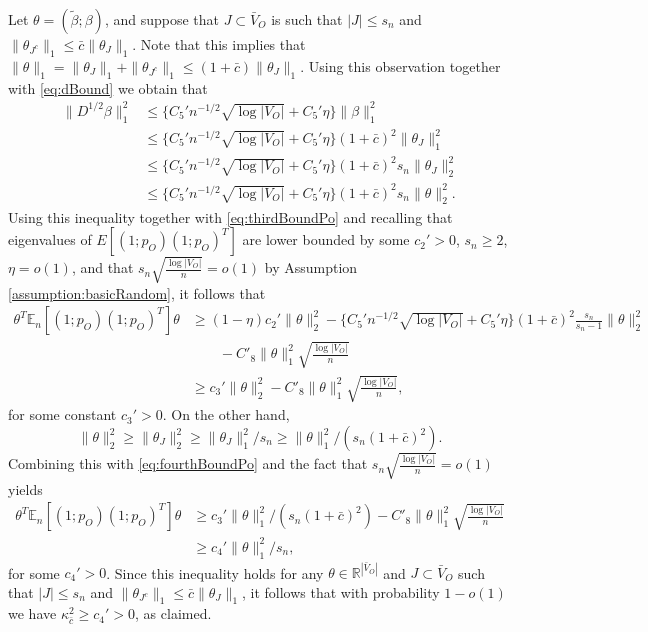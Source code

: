 \documentclass[opre,nonblindrev]{informs3} %
\def\En{{\mathbb{E}_n}}
\begin{document}
\begin{APPENDIX}{}
Let $\theta= (\tilde \beta; \beta)$, and suppose that
$J\subset \bar{V}_O$ is such that
$|J|\leq s_n$ and  $\|\theta_{J^c}\|_1\leq \bar{c} \|\theta_{J}\|_1$.
Note that this implies that $\|\theta\|_1 =
\|\theta_J\|_1+\|\theta_{J^c}\|_1\leq (1+\bar{c})\|\theta_J\|_1$.
Using
this observation together with
\eqref{eq:dBound}
we obtain that
$$\begin{array}{rl}
\|D^{1/2}\beta\|_1^2 & \leq \{C_5'n^{-1/2}\sqrt{\log |V_O|} + C_5'\eta\}\|\beta\|_1^2 \\
& \leq \{C_5'n^{-1/2}\sqrt{\log |V_O|} + C_5'\eta\}(1+\bar{c})^2\|\theta_{J}\|_1^2 \\
& \leq \{C_5'n^{-1/2}\sqrt{\log |V_O|} + C_5'\eta\}(1+\bar{c})^2s_n\|\theta_J\|_2^2 \\
& \leq \{C_5'n^{-1/2}\sqrt{\log |V_O|} + C_5'\eta\}(1+\bar{c})^2s_n\|\theta\|_2^2.
\end{array}$$
Using this inequality together with
\eqref{eq:thirdBoundPo}
and  recalling that 
eigenvalues of $E[(1;p_O)(1;p_O)^T]$ are lower bounded by some $c_2'>0$, $s_n\geq 2$, 
$\eta=o(1)$,
and that $s_n \sqrt{\frac{\log |V_O|}{n}}  = o(1)$ by Assumption \ref{assumption:basicRandom},
it follows that
\begin{equation} \label{eq:fourthBoundPo}
\begin{aligned}
\theta^T \En[(1;p_O)  (1;p_O)^T]\theta
&\geq
(1-\eta) c_2' \|\theta\|_2^2
-
\{C_5'n^{-1/2}\sqrt{\log |V_O|} + C_5'\eta\}(1+\bar{c})^2\frac{s_n}{s_n-1}\|\theta\|_2^2 \\
&\qquad
-C'_8\|\theta\|_1^2\sqrt{\frac{\log |V_O|}{n}}\\
&\geq c_3' \|\theta \|_2^2  - C'_8\|\theta \|_1^2\sqrt{\frac{\log |V_O|}{n}},
\end{aligned}
\end{equation}
for some constant $c_3'>0$.
On the other hand,
\begin{equation} \label{eq:thetaBound}
\|\theta\|_2^2 \geq \|\theta_J\|_2^2 \geq \|\theta_J \|_1^2/s_n \geq \|\theta \|_1^2/({s_n(1+\bar{c})^2}).
\end{equation}
Combining this with \eqref{eq:fourthBoundPo}
and the fact that
$s_n \sqrt{\frac{\log |V_O|}{n}}  = o(1)$
yields
\begin{equation} \label{eq:fifthBoundPo}
\begin{aligned}
\theta^T \En[(1;p_O)  (1;p_O)^T]\theta
&\geq c_3' \|\theta \|_1^2/({s_n(1+\bar{c})^2})  - C'_8\|\theta\|_1^2\sqrt{\frac{\log |V_O|}{n}} \\
&\geq c_4' \|\theta\|_1^2/{s_n} ,
\end{aligned}
\end{equation}
for some $c_4'>0$.
Since this inequality holds for any $\theta \in \mathbb{R}^{|\bar{V}_O|}$
and
$J\subset \bar{V}_O$  such that
$|J|\leq s_n$ and  $\|\theta_{J^c}\|_1\leq \bar{c} \|\theta_{J}\|_1$,
it follows that
with probability $1-o(1)$ we have
$\kappa^2_{\bar{c}} \geq c_4'>0$, as claimed.


\end{APPENDIX}
\end{document}
